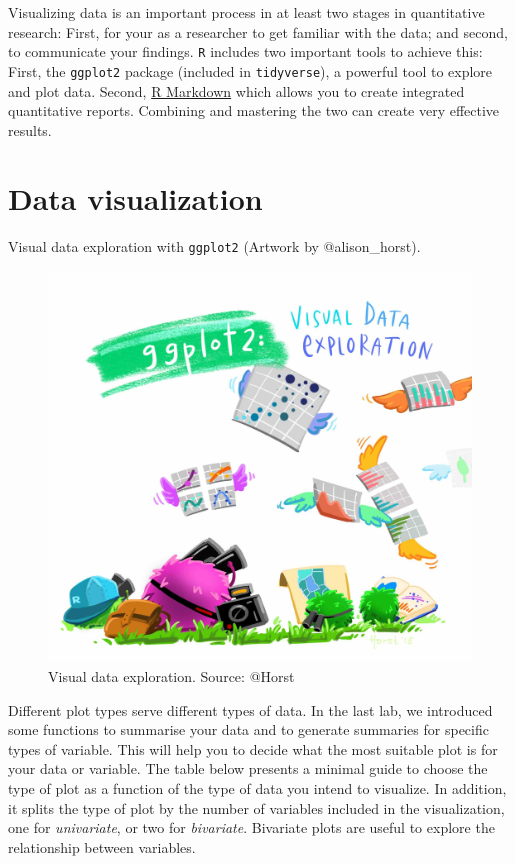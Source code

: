 \documentclass[
]{book}
\begin{document}
Visualizing data is an important process in at least two stages in quantitative research: First, for your as a researcher to get familiar with the data; and second, to communicate your findings. \texttt{R} includes two important tools to achieve this: First, the \texttt{ggplot2} package (included in \texttt{tidyverse}), a powerful tool to explore and plot data. Second, \href{https://rmarkdown.rstudio.com/}{R Markdown} which allows you to create integrated quantitative reports. Combining and mastering the two can create very effective results.

\hypertarget{data-visualization}{%
\section{Data visualization}\label{data-visualization}}

Visual data exploration with \texttt{ggplot2} (Artwork by @alison\_horst).

\begin{figure}

\includegraphics[width=1\linewidth]{./images/lab4_ggplot2_exploratory} \hfill{}

\caption{Visual data exploration. Source: @Horst}\label{fig:unnamed-chunk-61}
\end{figure}

Different plot types serve different types of data. In the last lab, we introduced some functions to summarise your data and to generate summaries for specific types of variable. This will help you to decide what the most suitable plot is for your data or variable. The table below presents a minimal guide to choose the type of plot as a function of the type of data you intend to visualize. In addition, it splits the type of plot by the number of variables included in the visualization, one for \emph{univariate}, or two for \emph{bivariate}. Bivariate plots are useful to explore the relationship between variables.
\end{document}
